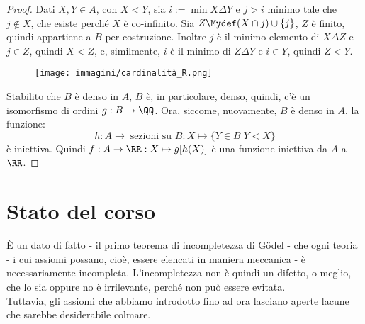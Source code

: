 \documentclass[11pt]{scrartcl}
\begin{document}
\begin{proof}
	Dati $X,Y \in A$, con $X < Y$, sia $i := \min X \Delta Y$ e $j > i$ minimo tale che $j \not \in X$, che esiste perché $X$ è co-infinito. Sia $Z \Mydef (X \cap j) \cup \{j\}$,
	$Z$ è finito, quindi appartiene a $B$ per costruzione. Inoltre $j$ è il minimo elemento di $X \Delta Z$ e $j \in Z$, quindi $X < Z$, e, similmente, $i$ è il minimo di $Z \Delta Y$ e $i \in Y$, quindi $Z < Y$.
	\begin{figure}[H]
		\centering
		\texttt{[image: immagini/cardinalità\_R.png]}
	\end{figure}
	Stabilito che $B$ è denso in $A$, $B$ è, in particolare, denso, quindi, c'è un isomorfismo di ordini $g : B \rightarrow \QQ$. Ora, siccome, nuovamente, $B$ è denso in $A$,
	la funzione:
	\[ h : A \rightarrow \; \text{sezioni su $B$} : X \mapsto \{Y \in B | Y < X\}
		\]
	è iniettiva. Quindi $f : A \rightarrow \RR : X \mapsto g[h(X)]$ è una funzione iniettiva da $A$ a $\RR$.
\end{proof}










\newpage
\section*{Stato del corso}
È un dato di fatto - il primo teorema di incompletezza di Gödel - che ogni teoria  - i cui assiomi possano, cioè, essere elencati 
in maniera meccanica - è necessariamente incompleta. L'incompletezza non è quindi un difetto, o meglio, che lo sia oppure no è irrilevante, perché 
non può essere evitata.\\
Tuttavia, gli assiomi che abbiamo introdotto fino ad ora lasciano aperte lacune che sarebbe desiderabile colmare.
\end{document}
